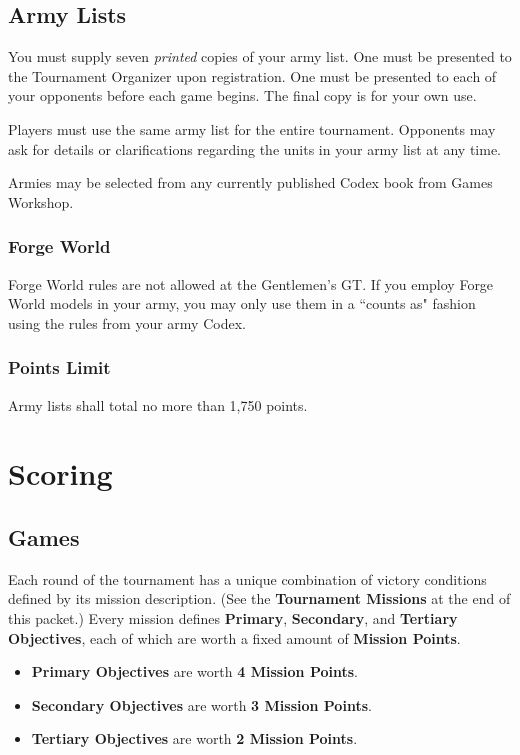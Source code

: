 \documentclass[10pt,titlepage]{article}
\begin{document}
\subsection*{Army Lists}

You must supply seven \textit{printed} copies of your army list. One must be presented to the Tournament Organizer upon registration. One must be presented to each of your opponents before each game begins. The final copy is for your own use.

Players must use the same army list for the entire tournament. Opponents may ask for details or clarifications regarding the units in your army list at any time.

Armies may be selected from any currently published Codex book from Games Workshop.

\subsubsection*{Forge World}

Forge World rules are not allowed at the Gentlemen's GT. If you employ Forge World models in your army, you may only use them in a ``counts as" fashion using the rules from your army Codex.

\subsubsection*{Points Limit}

Army lists shall total no more than 1,750 points.

\section*{Scoring}

\subsection*{Games}

Each round of the tournament has a unique combination of victory conditions defined by its mission description. (See the \textbf{Tournament Missions} at the end of this packet.) Every mission defines \textbf{Primary}, \textbf{Secondary}, and \textbf{Tertiary Objectives}, each of which are worth a fixed amount of \textbf{Mission Points}.

\begin{itemize}
\setlength{\itemsep}{0pt}
\item \textbf{Primary Objectives} are worth \textbf{4 Mission Points}.
\item \textbf{Secondary Objectives} are worth \textbf{3 Mission Points}.
\item \textbf{Tertiary Objectives} are worth \textbf{2 Mission Points}.
\end{itemize}
\end{document}
